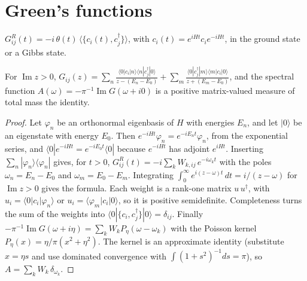 \chapter{Green's functions}


\begin{definition}\label{def:green-ret}
  \leanok
  $G^R_{ij}(t) = -i\,\theta(t)\,\langle\{c_i(t),c_j^\dagger\}\rangle$, with $c_i(t)=e^{iHt}c_ie^{-iHt}$, in the ground state
  or a Gibbs state.
\end{definition}

\begin{theorem}\label{thm:lehmann}
  \leanok
  For $\operatorname{Im}z>0$,
  $G_{ij}(z) = \sum_{n}\frac{\langle 0|c_i|n\rangle\langle n|c_j^\dagger|0\rangle}{z-(E_n-E_0)}
             + \sum_{m}\frac{\langle 0|c_j^\dagger|m\rangle\langle m|c_i|0\rangle}{z+(E_m-E_0)}$,
  and the spectral function $A(\omega) = -\pi^{-1}\operatorname{Im}G(\omega+i0)$ is a positive matrix-valued measure of total
  mass the identity.
\end{theorem}
\begin{proof}\leanok
  Let $\varphi_n$ be an orthonormal eigenbasis of $H$ with energies $E_n$, and let $|0\rangle$ be an eigenstate with energy
  $E_0$. Then $e^{-iHt}\varphi_n=e^{-iE_nt}\varphi_n$, from the exponential series, and $\langle0|e^{-iHt}=e^{-iE_0t}\langle0|$
  because $e^{-iHt}$ has adjoint $e^{iHt}$. Inserting $\sum_n|\varphi_n\rangle\langle\varphi_n|$ gives, for $t>0$,
  $G^R_{ij}(t)=-i\sum_kW_{k,ij}\,e^{-i\omega_kt}$ with the poles $\omega_n=E_n-E_0$ and $\omega_m=E_0-E_m$. Integrating
  $\int_0^\infty e^{i(z-\omega)t}\,dt=i/(z-\omega)$ for $\operatorname{Im}z>0$ gives the formula. Each weight is a rank-one
  matrix $u\,u^\dagger$, with $u_i=\langle0|c_i|\varphi_n\rangle$ or $u_i=\langle\varphi_m|c_i|0\rangle$, so it is positive
  semidefinite. Completeness turns the sum of the weights into $\langle0|\{c_i,c_j^\dagger\}|0\rangle=\delta_{ij}$. Finally
  $-\pi^{-1}\operatorname{Im}G(\omega+i\eta)=\sum_kW_kP_\eta(\omega-\omega_k)$ with the Poisson kernel
  $P_\eta(x)=\eta/\pi(x^2+\eta^2)$. The kernel is an approximate identity (substitute $x=\eta s$ and use dominated
  convergence with $\int(1+s^2)^{-1}ds=\pi$), so $A=\sum_kW_k\,\delta_{\omega_k}$.
\end{proof}

